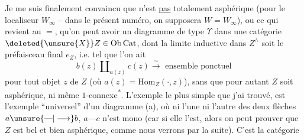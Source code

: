 Je me suis finalement convaincu que
n’est \uline{pas} totalement asphérique (pour le localiseur $W_\infty$ -- dans le présent numéro, on supposera $W=W_\infty$), ou ce qui revient au $=$, qu’on peut avoir un diagramme de type $\Upsilon$
dans une catégorie $\deleted{\unsure{X}}Z\in\mathrm{Ob}\,\mathrm{Cat}$, dont la limite inductive  dans $Z^{\wedge}$ soit le préfaisceau final $e_Z$, i.e. tel que l’on ait
\[
b(z)\amalg_{a(z)}c(z)\overset{\sim}{\longrightarrow}\text{ ensemble ponctuel}
\]
pour tout objet $z$ de $Z$ (où $a(z)=\mathrm{Hom}_{Z}(\cdot,z)$), sans que pour autant $Z$ soit asphérique, ni même $1$-connexe\textsuperscript{*}.
L’exemple le plus simple que j’ai trouvé, est l’exemple ``universel'' d’un diagramme (a), où  ni l’une ni l’autre des deux flèches $a\unsure{\text{---}|\longrightarrow}b$, $a\text{---}c$ n’est mono (car si elle l’est, alors on peut prouver que $Z$ est bel et bien asphérique, comme nous verrons par la suite). C’est la catégorie


